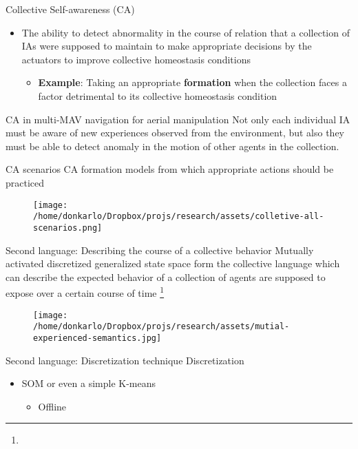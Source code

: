 \documentclass[unknownkeysallowed]{beamer}
\begin{document}
	\begin{frame}{Collective Self-awareness (CA)}
		\begin{itemize}
			\item The ability to detect abnormality in the course of relation that a collection of IAs were supposed to maintain to make appropriate decisions by the actuators to improve collective homeostasis conditions
			\begin{itemize}
				\item \textbf{Example}: Taking an appropriate \textbf{formation} when the collection faces a factor detrimental to its collective homeostasis condition
			\end{itemize}
		\end{itemize}
	\end{frame}

	\begin{frame}{CA in multi-MAV navigation for aerial manipulation}
		Not only each individual IA must be aware of new experiences observed from the environment, but also they must be able to detect anomaly in the motion of other agents in the collection.
	\end{frame}

	\begin{frame}{CA scenarios}
		CA formation models from which appropriate actions should be practiced
		\begin{figure}
			\texttt{[image: /home/donkarlo/Dropbox/projs/research/assets/colletive-all-scenarios.png]}
			\caption{}
		\end{figure}
	\end{frame}

	\begin{frame}{Second language: Describing the course of a collective behavior}
		Mutually activated discretized generalized state space form the collective language which can describe the expected behavior of a collection of agents are supposed to expose over a certain course of time \footnote{}
		\begin{figure}
			\texttt{[image: /home/donkarlo/Dropbox/projs/research/assets/mutial-experienced-semantics.jpg]}
			\caption{}
		\end{figure}
	\end{frame}

	\begin{frame}{Second language: Discretization technique}
		Discretization
		\begin{itemize}
			\item SOM  or even a simple K-means
			\begin{itemize}
				\item Offline
			\end{itemize}
		\end{itemize}
	\end{frame}
	
\end{document}

